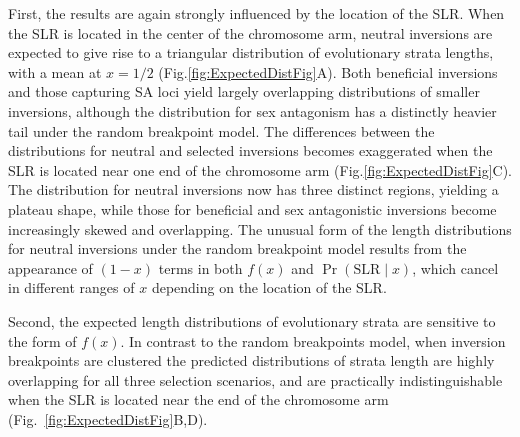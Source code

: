 \documentclass{article}
\begin{document}
First, the results are again strongly influenced by the location of the SLR. When the SLR is located in the center of the chromosome arm, neutral inversions are expected to give rise to a triangular distribution of evolutionary strata lengths, with a mean at $x = 1/2$ (Fig.\ref{fig:ExpectedDistFig}A). Both beneficial inversions and those capturing SA loci yield largely overlapping distributions of smaller inversions, although the distribution for sex antagonism has a distinctly heavier tail under the random breakpoint model. The differences between the distributions for neutral and selected inversions becomes exaggerated when the SLR is located near one end of the chromosome arm (Fig.\ref{fig:ExpectedDistFig}C). The distribution for neutral inversions now has three distinct regions, yielding a plateau shape, while those for beneficial and sex antagonistic inversions become increasingly skewed and overlapping. The unusual form of the length distributions for neutral inversions under the random breakpoint model results from the appearance of $(1 - x)$ terms in both $f(x)$ and $\Pr(\text{SLR} \mid x)$, which cancel in different ranges of $x$ depending on the location of the SLR.  

Second, the expected length distributions of evolutionary strata are sensitive to the form of $f(x)$. In contrast to the random breakpoints model, when inversion breakpoints are clustered the predicted distributions of strata length are highly overlapping for all three selection scenarios, and are practically indistinguishable when the SLR is located near the end of the chromosome arm (Fig.~\ref{fig:ExpectedDistFig}B,D). \vspace{12pt}

\end{document}
